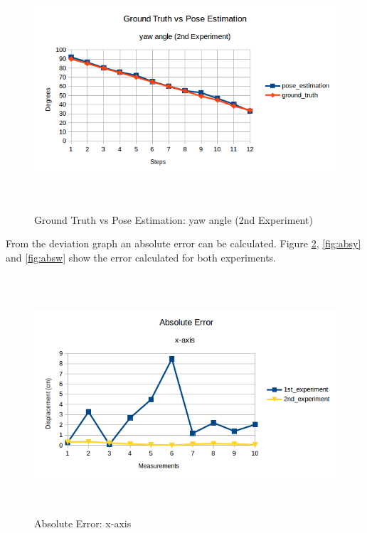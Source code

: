 \begin{figure}[!h]
\begin{center}
\includegraphics[width=5in, height=3.5in]{figures05/2_yaw_validation.png}
\caption{Ground Truth vs Pose Estimation: yaw angle (2nd Experiment)}
\label{fig:erroryaw_2nd}
\end{center}
\end{figure}

From the deviation graph an absolute error can be calculated. Figure \ref{fig:absx}, \ref{fig:absy} and \ref{fig:absw} show the error calculated for both experiments.

\begin{figure}[!h]
\begin{center}
\includegraphics[width=5in, height=3.5in]{figures05/abs_error_x.png}
\caption{Absolute Error: x-axis}
\label{fig:absx}
\end{center}
\end{figure}


